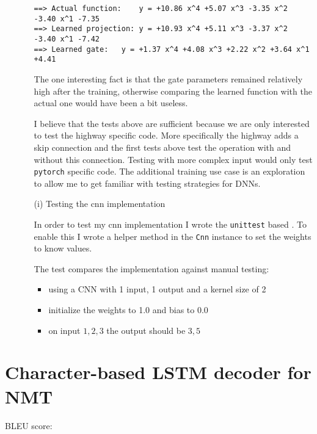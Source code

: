 \documentclass{article}
\begin{document}
\begin{enumerate}
\begin{itemize}
\begin{verbatim}
==> Actual function:	y = +10.86 x^4 +5.07 x^3 -3.35 x^2 -3.40 x^1 -7.35
==> Learned projection:	y = +10.93 x^4 +5.11 x^3 -3.37 x^2 -3.40 x^1 -7.42
==> Learned gate:	y = +1.37 x^4 +4.08 x^3 +2.22 x^2 +3.64 x^1 +4.41
\end{verbatim}

The one interesting fact is that the gate parameters remained relatively high after the training, otherwise comparing the learned function with the actual one would have been a bit useless.

I believe that the tests above are sufficient because we are only interested to test the highway specific code. More specifically the highway adds a skip connection and the first tests above test the operation with and without this connection. Testing with more complex input would only test \texttt{pytorch} specific code. The additional training use case is an exploration to allow me to get familiar with testing strategies for DNNs.

\clearpage

\item[(i)]{Testing the cnn implementation}

In order to test my cnn implementation I wrote the \texttt{unittest} based . To enable this I wrote a helper method in the \texttt{Cnn} instance to set the weights to know values.

The test compares the implementation against manual testing: 

\begin{itemize}

\item using a CNN with 1 input, 1 output and a kernel size of 2
\item initialize the weights to 1.0 and bias to 0.0
\item on input $1, 2, 3$ the output should be $3,5$
\end{itemize}

\end{itemize}


\end{enumerate}

\clearpage


\section{Character-based LSTM decoder for NMT}

BLEU score:
\end{document}
